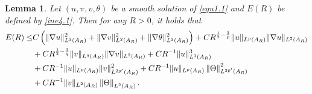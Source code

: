 \documentclass[11pt,reqno]{amsart}
\newtheorem{Lem}{Lemma}[section]
\numberwithin{Thm}{section}
\begin{document}
\begin{Lem}\label{Lem4.2}
	Let $(u,\pi,v,\theta)$ be a smooth solution of \eqref{equ1.1} and $E(R)$ be defined by \eqref{ine4.1}. Then for any $R>0$, it holds that
	\begin{align}\label{ine4.3}
		E(R)\leq& C\left(\|\nabla u\|_{L^2(A_R)}^2+\|\nabla v\|_{L^2(A_R)}^2+\|\nabla \theta\|_{L^2(A_R)}^2\right)+CR^{\frac{1}{2}-\frac{3}{p}}\|u\|_{L^p(A_R)}\|\nabla u\|_{L^2(A_R)}\notag\\
		&+CR^{\frac{1}{2}-\frac{3}{q}}\|v\|_{L^q(A_R)}\|\nabla v\|_{L^2(A_R)}+CR^{-1}\|u\|_{L^3(A_R)}^3\notag\\
		&+CR^{-1}\|u\|_{L^p(A_R)}\|v\|_{L^{2p'}(A_R)}^2+CR^{-1}\|u\|_{L^p(A_R)}\left\|\Theta\right\|_{L^{2p'}(A_R)}^2\\
        &+CR^{-1}\|v\|_{L^2(A_R)}\left\|\Theta\right\|_{L^2(A_R)}.\notag
	\end{align}
\end{Lem}
\end{document}
